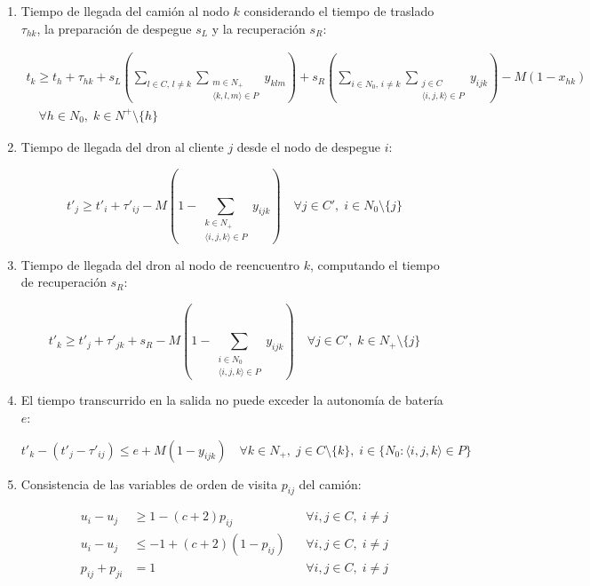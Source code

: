 \begin{enumerate}
\item Tiempo de llegada del camión al nodo $k$ considerando el tiempo de traslado $\tau_{hk}$, la preparación de despegue $s_L$ y la recuperación $s_R$:

\begin{align*}
t_k \ge t_h + \tau_{hk} + s_L \left(\sum_{l \in C,\, l \neq k} \sum_{\substack{m \in N_+ \\ \langle k,l,m \rangle \in P}} y_{klm}\right) + s_R \left(\sum_{i \in N_0,\, i \neq k} \sum_{\substack{j \in C \\ \langle i,j,k \rangle \in P}} y_{ijk}\right) - M(1 - x_{hk})  \tag{16} \\
\quad \forall h \in N_0, \; k \in N^+ \setminus \{h\} 
\end{align*}

\item Tiempo de llegada del dron al cliente $j$ desde el nodo de despegue $i$:

\begin{equation}
t'_j \ge t'_i + \tau'_{ij} - M\left(1 - \sum_{\substack{k \in N_+ \\ \langle i,j,k \rangle \in P}} y_{ijk}\right) \quad \forall j \in C', \; i \in N_0 \setminus \{j\} 
\tag{17}
\end{equation}

\item Tiempo de llegada del dron al nodo de reencuentro $k$, computando el tiempo de recuperación $s_R$:

\begin{equation}
t'_k \ge t'_j + \tau'_{jk} + s_R - M\left(1 - \sum_{\substack{i \in N_0 \\ \langle i,j,k \rangle \in P}} y_{ijk}\right) \quad \forall j \in C', \; k \in N_+ \setminus \{j\} 
\tag{18}
\end{equation}

\item El tiempo transcurrido en la salida no puede exceder la autonomía de batería $e$:

\begin{equation}
t'_k - (t'_j - \tau'_{ij}) \le e + M(1 - y_{ijk}) \quad \forall k \in N_+, \; j \in C \setminus \{k\}, \; i \in \{N_0 : \langle i,j,k \rangle \in P\} 
\tag{19}
\end{equation}

\item Consistencia de las variables de orden de visita $p_{ij}$ del camión:

\begin{align*}
u_i - u_j &\ge 1 - (c+2) p_{ij} && \forall i, j \in C, \; i \neq j \tag{20} \\
u_i - u_j &\le -1 + (c+2)(1 - p_{ij}) && \forall i, j \in C, \; i \neq j \tag{21} \\
p_{ij} + p_{ji} &= 1 && \forall i, j \in C, \; i \neq j \tag{22}
\end{align*}


\end{enumerate}
